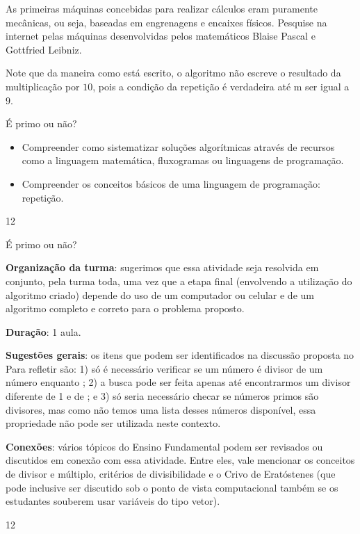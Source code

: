 \begin{knowledge}
As primeiras máquinas concebidas para realizar cálculos eram puramente mecânicas, ou seja, baseadas em engrenagens e encaixes físicos. Pesquise na internet pelas máquinas desenvolvidas pelos matemáticos Blaise Pascal e Gottfried Leibniz.
\end{knowledge}

\begin{texto}
{
	Note que da maneira como está escrito, o algoritmo não escreve o resultado da multiplicação por $10$, pois a condição da repetição é verdadeira até m ser igual a $9$.
}
\end{texto}
\clearmargin
\begin{objectives}{É primo ou não?}
{
\begin{itemize}
\item Compreender como sistematizar soluções algorítmicas através de recursos como a linguagem matemática, fluxogramas ou linguagens de programação.

\item Compreender os conceitos básicos de uma linguagem de programação: repetição.
\end{itemize}
}{1}{2}
\end{objectives}
\begin{sugestions}{É primo ou não?}
{
\textbf{Organização da turma}: sugerimos que essa atividade seja resolvida em conjunto, pela turma toda, uma vez que a etapa final (envolvendo a utilização do algoritmo criado) depende do uso de um computador ou celular e de um algoritmo completo e correto para o problema proposto.

\textbf{Duração}: 1 aula.

\textbf{Sugestões gerais}: os itens que podem ser identificados na discussão proposta no Para refletir são: 1) só é necessário verificar se um número  é divisor de um número  enquanto ; 2) a busca pode ser feita apenas até encontrarmos um divisor diferente de 1 e de ; e 3) só seria necessário checar se números primos são divisores, mas como não temos uma lista desses números disponível, essa propriedade não pode ser utilizada neste contexto.

\textbf{Conexões}: vários tópicos do Ensino Fundamental podem ser revisados ou discutidos em conexão com essa atividade. Entre eles, vale mencionar os conceitos de divisor e múltiplo, critérios de divisibilidade e o Crivo de Eratóstenes (que pode inclusive ser discutido sob o ponto de vista computacional também se os estudantes souberem usar variáveis do tipo vetor).
}{1}{2}
\end{sugestions}
